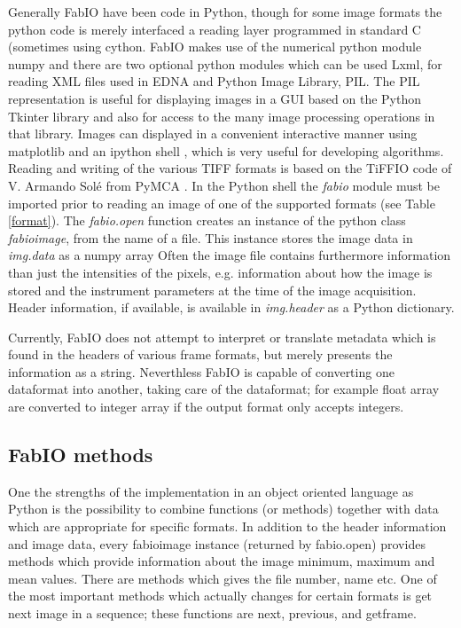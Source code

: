 \documentclass{iucr}
\begin{document}
Generally FabIO have been code in Python\cite{python},
though for some image formats the python code is merely interfaced a reading
layer programmed in standard C (sometimes using cython\cite{cython}.
FabIO makes use of the numerical python module numpy\cite{numpy} and there are
two optional python modules which can be used Lxml, for reading XML files
used in EDNA\cite{edna} and Python Image Library, PIL\cite{pil}.
The PIL representation is useful for displaying images in a GUI based on
the Python Tkinter library\cite{tkinter} and also for access
to the many image processing operations in that library.
Images can displayed in a convenient interactive manner using
matplotlib\cite{matplotlib} and an ipython shell \cite{ipython}, which is
very useful for developing algorithms.
Reading and writing of the various TIFF \cite{tiff} formats is based on the
TiFFIO code of V. Armando Sol\'e from PyMCA \cite{pymca}.
In the Python shell the {\em fabio} module must be imported prior to reading an
image of one of the supported formats (see Table \ref{format}).
The {\em fabio.open} function creates an instance of the python class {\em fabioimage},
from the name of a file.
This instance stores the image data in {\em img.data} as a numpy array
Often the image file contains furthermore information than just
the intensities of the pixels, e.g. information about how the image is
stored and the instrument parameters at the time of the image acquisition.
Header information, if available, is available in {\em img.header} as a Python
dictionary.

Currently, FabIO does not attempt to interpret or translate metadata which
is found in the headers of various frame formats, but merely presents the
information as a string. Neverthless FabIO is capable of converting one
dataformat into another, taking care of the dataformat; for example float array
are converted to integer array if the output format only accepts integers.


\subsection{FabIO methods}

One the strengths of the implementation in an object oriented language as Python
is the possibility to combine functions (or methods) together with data which
are appropriate for specific formats.
In addition to the header information and image data, every fabioimage instance
(returned by fabio.open) provides methods which provide information about the image minimum, maximum and mean values.
There are methods which gives the file number, name etc. One of the most important methods which  actually changes for certain formats
is get next image in a sequence; these functions are next, previous, and
getframe.
\end{document}

